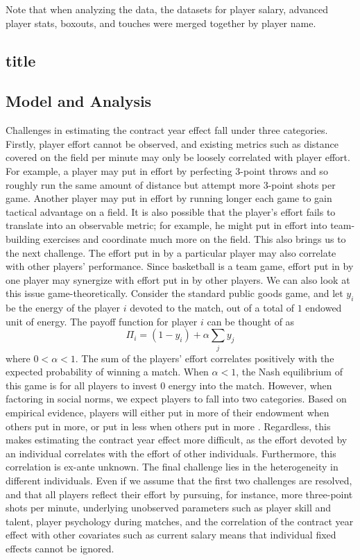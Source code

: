 \documentclass[12pt]{article}
\begin{document}
	Note that when analyzing the data, the datasets for player salary, advanced player stats, boxouts, and touches were merged together by player name. 
	
	\subsection{title}
	
	\subsection{Model and Analysis}
	
	Challenges in estimating the contract year effect fall under three categories. Firstly, player effort cannot be observed, and existing metrics such as distance covered on the field per minute may only be loosely correlated with player effort. For example, a player may put in effort by perfecting 3-point throws and so roughly run the same amount of distance but attempt more 3-point shots per game. Another player may put in effort by running longer each game to gain tactical advantage on a field. It is also possible that the player's effort fails to translate into an observable metric; for example, he might put in effort into team-building exercises and coordinate much more on the field. This also brings us to the next challenge. The effort put in by a particular player may also correlate with other players' performance. Since basketball is a team game, effort put in by one player may synergize with effort put in by other players. We can also look at this issue game-theoretically. Consider the standard public goods game, and let $y_i$ be the energy of the player $i$ devoted to the match, out of a total of $1$ endowed unit of energy. The payoff function for player $i$ can be thought of as \[
	\Pi_i = \left(1 - y_i\right) + \alpha \sum_{j} y_j
	\] where $0<\alpha<1$. The sum of the players' effort correlates positively with the expected probability of winning a match. When $\alpha<1$, the Nash equilibrium of this game is for all players to invest $0$ energy into the match. However, when factoring in social norms, we expect players to fall into two categories. Based on empirical evidence, players will either put in more of their endowment when others put in more, or put in less when others put in more \citep{dong_dynamics_2016}. Regardless, this makes estimating the contract year effect more difficult, as the effort devoted by an individual correlates with the effort of other individuals. Furthermore, this correlation is ex-ante unknown. The final challenge lies in the heterogeneity in different individuals. Even if we assume that the first two challenges are resolved, and that all players reflect their effort by pursuing, for instance, more three-point shots per minute, underlying unobserved parameters such as player skill and talent, player psychology during matches, and the correlation of the contract year effect with other covariates such as current salary means that individual fixed effects cannot be ignored.
	
\end{document}
